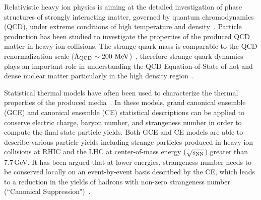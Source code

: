 \documentclass[%
 reprint,	
showpacs,
 amsmath,amssymb,
 aps,
 superscriptaddress,
]{revtex4-1}
\begin{document}
\maketitle


Relativistic heavy ion physics is aiming at the detailed investigation of phase structures of strongly interacting matter, governed by quantum chromodynamics (QCD), under extreme conditions of high temperature and density~\cite{akiba2015hot,Busza_ARNPS,StarWhitePaper}. Particle production has been studied to investigate the properties of the produced QCD matter in heavy-ion collisions. The strange quark mass is comparable to the QCD renormalization scale ($\Lambda_{\rm{QCD}}$\,$\sim\textup{200 MeV}$)~\cite{Rafelski:1982pu,Koch:1986ud}, 
therefore strange quark dynamics plays an important role in understanding the QCD Equation-of-State of hot and dense nuclear matter particularly in the high density region~\cite{KO_sQM17,Danielewicz1592,Tetyana_ICNN,KO.PhysRevLett.55.2661,Ks0_Lambda_HADES,CASSING.openCharm.2001753}. 

Statistical thermal models have often been used to characterize the thermal properties of the produced media~\cite{Andronic_2018Naure,Rafelski_1980279,Cleymans:1992zc,Becattini:1997ii,Florkowski:2001fp,Redlich_CE,Rafelski_PRC}. In these models, grand canonical ensemble (GCE) and canonical ensemble (CE) statistical descriptions can be applied to conserve electric charge, baryon number, and strangeness number in order to compute the final state particle yields. Both GCE and CE models are able to describe various particle yields including strange particles produced in heavy-ion collisions at RHIC and the LHC at center-of-mass energy ($\sqrt{s_{\rm NN}}$) greater than 7.7\,GeV. It has been argued that at lower energies, strangeness number needs to be conserved locally on an event-by-event basis described by the CE, which leads to a reduction in the yields of hadrons with non-zero strangeness number (``Canonical Suppression")~\cite{Rafelski_1980279,Redlich:2001kb}.
\end{document}
